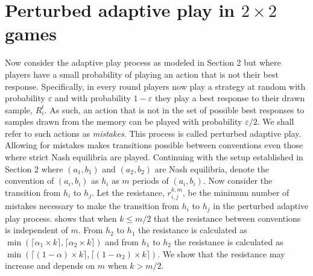 \documentclass[11.5pt]{article}
\begin{document}

\section{Perturbed adaptive play in $2 \times 2$ games}

Now consider the adaptive play process as modeled in Section 2 but where players have a small probability of playing an action that is not their best response. Specifically, in every round players now play a strategy at random with probability $\varepsilon$ and with probability $1-\varepsilon$ they play a best response to their drawn sample, $R_i^{t}$. As such, an action that is not in the set of possible best responses to samples drawn from the memory can be played with probability $\varepsilon/2$. We shall refer to such actions as \textit{mistakes}. This process is called perturbed adaptive play. Allowing for mistakes makes transitions possible between conventions even those where strict Nash equilibria are played. Continuing with the setup established in Section 2 where $(a_1, b_1)$ and $(a_2, b_2)$ are Nash equilibria, denote the convention of $(a_i, b_i)$ as $h_i$ as $m$ periods of $(a_i, b_i)$.
Now consider the transition from $h_i$ to $h_j$. Let the resistance, $r_{i,j}^{k,m}$, be the minimum number of mistakes necessary to make the transition from $h_i$ to $h_j$ in the perturbed adaptive play process.
\cite{Young1998} shows that when $k \leq m/2$ that the resistance between conventions is independent of $m$. From $h_2$ to $h_1$ the resistance is calculated as $\min(\lceil \alpha_1 \times k \rceil,\lceil \alpha_2 \times k \rceil)$ and from $h_1$ to $h_2$ the resistance is calculated as 
$\min(\lceil (1-\alpha) \times k \rceil,\lceil (1-\alpha_2) \times  k \rceil)$. We show that the resistance may increase and depends on $m$ when $k > m/2$.
\end{document}
